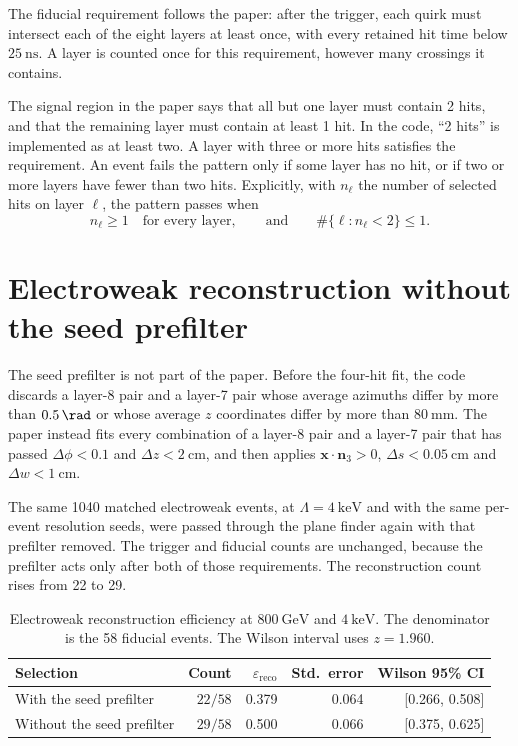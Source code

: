 \documentclass[11pt,a4paper]{article}
\begin{document}
The fiducial requirement follows the paper: after the trigger, each quirk must intersect each of the eight layers at least once, with every retained hit time below \(\SI{25}{\ns}\).
A layer is counted once for this requirement, however many crossings it contains.

The signal region in the paper says that all but one layer must contain 2 hits, and that the remaining layer must contain at least 1 hit.
In the code, ``2 hits'' is implemented as at least two.
A layer with three or more hits satisfies the requirement.
An event fails the pattern only if some layer has no hit, or if two or more layers have fewer than two hits.
Explicitly, with \(n_\ell\) the number of selected hits on layer \(\ell\), the pattern passes when
\[
n_\ell \ge 1 \quad\text{for every layer},
\qquad
\text{and}\qquad
\#\{\ell : n_\ell < 2\} \le 1.
\]

\section{Electroweak reconstruction without the seed prefilter}
The seed prefilter is not part of the paper.
Before the four-hit fit, the code discards a layer-8 pair and a layer-7 pair whose average azimuths differ by more than \(\SI{0.5}{\rad}\) or whose average \(z\) coordinates differ by more than \(\SI{80}{\mm}\).
The paper instead fits every combination of a layer-8 pair and a layer-7 pair that has passed \(\Delta\phi < 0.1\) and \(\Delta z < \SI{2}{\cm}\), and then applies \(\mathbf{x}\cdot\mathbf{n}_3 > 0\), \(\Delta s < \SI{0.05}{\cm}\) and \(\Delta w < \SI{1}{\cm}\).

The same 1040 matched electroweak events, at \(\Lambda = \SI{4}{\keV}\) and with the same per-event resolution seeds, were passed through the plane finder again with that prefilter removed.
The trigger and fiducial counts are unchanged, because the prefilter acts only after both of those requirements.
The reconstruction count rises from 22 to 29.

\begin{table}[H]
\centering
\caption{Electroweak reconstruction efficiency at \(\SI{800}{\GeV}\) and \(\SI{4}{\keV}\). The denominator is the 58 fiducial events. The Wilson interval uses \(z = 1.960\).}
\label{tab:prefilter}
\begin{tabular}{lrrrr}
\toprule
Selection & Count & \(\varepsilon_{\mathrm{reco}}\) & Std.\ error & Wilson 95\% CI \\
\midrule
With the seed prefilter    & \(22/58\) & 0.379 & 0.064 & [0.266, 0.508] \\
Without the seed prefilter & \(29/58\) & 0.500 & 0.066 & [0.375, 0.625] \\
\bottomrule
\end{tabular}
\end{table}
\end{document}
